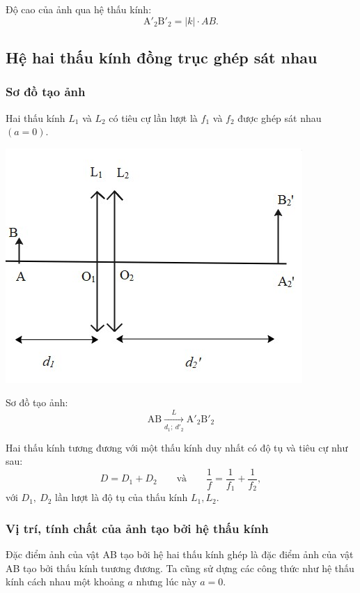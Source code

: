Độ cao của ảnh qua hệ thấu kính: $$\text{A}'_2\text{B}'_2=|k|\cdot AB.$$
\subsection{Hệ hai thấu kính đồng trục ghép sát nhau}
\subsubsection{Sơ đồ tạo ảnh}
Hai thấu kính $L_1$ và $L_2$ có tiêu cự lần lượt là $f_1$ và $f_2$ được ghép sát nhau $(a=0)$.
\begin{center}
	\includegraphics[scale=0.8]{../figs/VN11-PH-39-L-027-1-h30.jpg}
\end{center}
Sơ đồ tạo ảnh:
\begin{equation}
\text{AB}\xrightarrow[d_1;\ d'_2]{L} \text{A}'_2\text{B}'_2 
\end{equation}

Hai thấu kính tương đương với một thấu kính duy nhất có độ tụ và tiêu cự như sau: 
\begin{equation}
D = D_1 +D_2\qquad  \text{và}\qquad  \dfrac{1}{f}=\dfrac{1}{f_1}+\dfrac{1}{f_2},
\end{equation}
với $D_1,\ D_2$ lần lượt là độ tụ của thấu kính $L_1,L_2$.

\subsubsection{Vị trí, tính chất của ảnh tạo bởi hệ thấu kính}

Đặc điểm ảnh của vật AB tạo bởi hệ hai thấu kính ghép là đặc điểm ảnh của vật AB tạo bởi thấu kính tuương đương. Ta cũng sử dựng các công thức như hệ thấu kính cách nhau một khoảng $a$ nhưng lúc này $a=0$.


